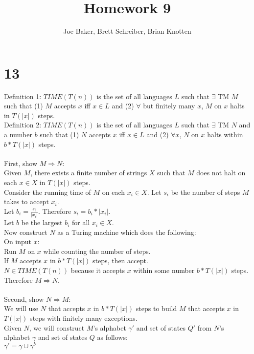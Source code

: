 \documentclass[letterpaper,notitlepage,twoside]{article}
\renewcommand{\implies}{\Rightarrow} %
\newcommand\tab[1][1cm]{\hspace*{#1}} %
\begin{document}
\title{Homework 9}
\author{Joe Baker, Brett Schreiber, Brian Knotten}
\maketitle

\section*{13}
Definition 1:  $TIME(T(n))$ is the set of all languages $L$ such that $\exists$ TM $M$ such that (1) $M$ accepts $x$ iff $x \in L$ and (2) $\forall$ but finitely many $x$, $M$ on $x$ halts in $T(|x|)$ steps. \\
Definition 2: $TIME(T(n))$ is the set of all languages $L$ such that $\exists$ TM $N$ and a number $b$ such that (1) $N$ accepts $x$ iff $x \in L$ and (2) $\forall x$, $N$ on $x$ halts within $b * T(|x|)$ steps. \\ \\
First, show $M \implies N$: \\
Given $M$, there exists a finite number of strings $X$ such that $M$ does not halt on each $x \in X$ in $T(|x|)$ steps. \\
Consider the running time of $M$ on each $x_i \in X$. Let $s_i$ be the number of steps $M$ takes to accept $x_i$.\\
Let $b_i = \frac{s_i}{|x_i|}$. Therefore $s_i = b_i * |x_i|$.\\
Let $b$ be the largest $b_i$ for all $x_i \in X$.\\
Now construct $N$ as a Turing machine which does the following: \\
On input $x$: \\
	\tab Run $M$ on $x$ while counting the number of steps. \\
	\tab If $M$ accepts $x$ in $b * T(|x|)$ steps, then accept. \\
$N \in TIME(T(n))$ because it accepts $x$ within some number $b * T(|x|)$ steps. Therefore $M \implies N$. \\ \\
Second, show $N \implies M:$ \\
We will use $N$ that accepts $x$ in $b * T(|x|)$ steps to build $M$ that accepts $x$ in $T(|x|)$ steps with finitely many exceptions. \\
Given $N$, we will construct $M$'s alphabet $\gamma '$ and set of states $Q'$ from $N$'s alphabet $\gamma$ and set of states $Q$ as follows: \\
$\gamma ' = \gamma \cup \gamma^{b}$ \\
\end{document}
